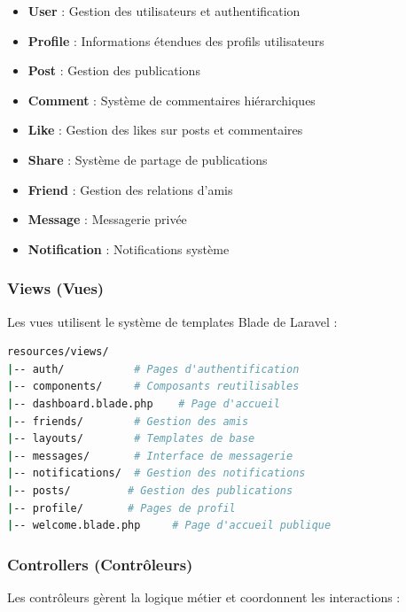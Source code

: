 \documentclass[12pt,a4paper]{article}
\begin{document}
\begin{itemize}
    \item \textbf{User} : Gestion des utilisateurs et authentification
    \item \textbf{Profile} : Informations \'etendues des profils utilisateurs
    \item \textbf{Post} : Gestion des publications
    \item \textbf{Comment} : Syst\`eme de commentaires hi\'erarchiques
    \item \textbf{Like} : Gestion des likes sur posts et commentaires
    \item \textbf{Share} : Syst\`eme de partage de publications
    \item \textbf{Friend} : Gestion des relations d'amis
    \item \textbf{Message} : Messagerie priv\'ee
    \item \textbf{Notification} : Notifications syst\`eme
\end{itemize}

\subsubsection{Views (Vues)}
Les vues utilisent le syst\`eme de templates Blade de Laravel :

\begin{lstlisting}[language=bash]
resources/views/
|-- auth/           # Pages d'authentification
|-- components/     # Composants reutilisables
|-- dashboard.blade.php    # Page d'accueil
|-- friends/        # Gestion des amis
|-- layouts/        # Templates de base
|-- messages/       # Interface de messagerie
|-- notifications/  # Gestion des notifications
|-- posts/         # Gestion des publications
|-- profile/       # Pages de profil
|-- welcome.blade.php     # Page d'accueil publique
\end{lstlisting}

\subsubsection{Controllers (Contr\^oleurs)}
Les contr\^oleurs g\`erent la logique m\'etier et coordonnent les interactions :
\end{document}
